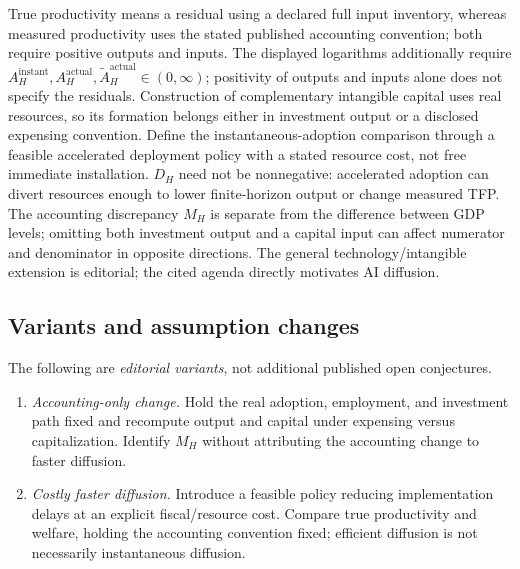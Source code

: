 \documentclass[11pt,a4paper]{article}
\begin{document}
True productivity means a residual using a declared full input inventory, whereas measured productivity uses the stated published accounting convention; both require positive outputs and inputs. The displayed logarithms additionally require \(A_H^{\mathrm{instant}},A_H^{\mathrm{actual}},\widetilde A_H^{\mathrm{actual}}\in(0,\infty)\); positivity of outputs and inputs alone does not specify the residuals. Construction of complementary intangible capital uses real resources, so its formation belongs either in investment output or a disclosed expensing convention. Define the instantaneous-adoption comparison through a feasible accelerated deployment policy with a stated resource cost, not free immediate installation. \(D_H\) need not be nonnegative: accelerated adoption can divert resources enough to lower finite-horizon output or change measured TFP. The accounting discrepancy \(M_H\) is separate from the difference between GDP levels; omitting both investment output and a capital input can affect numerator and denominator in opposite directions. The general technology/intangible extension is editorial; the cited agenda directly motivates AI diffusion.
\subsection*{Variants and assumption changes}
The following are \emph{editorial variants}, not additional published open conjectures.
\begin{enumerate}
\item \emph{Accounting-only change.} Hold the real adoption, employment, and investment path fixed and recompute output and capital under expensing versus capitalization. Identify \(M_H\) without attributing the accounting change to faster diffusion.
\item \emph{Costly faster diffusion.} Introduce a feasible policy reducing implementation delays at an explicit fiscal/resource cost. Compare true productivity and welfare, holding the accounting convention fixed; efficient diffusion is not necessarily instantaneous diffusion.
\end{enumerate}
\end{document}
